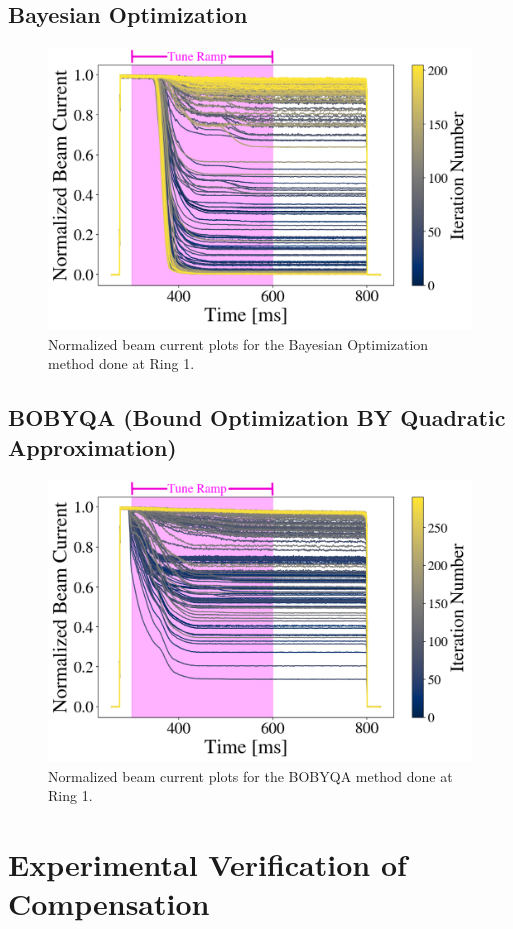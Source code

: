 \subsection{Bayesian Optimization}

\begin{figure}[H]
    \centering
    \includegraphics[width=\linewidth]{chapter5/i1_bo_commented.png}
    \caption{Normalized beam current plots for the Bayesian Optimization method done at Ring 1.}
    \label{fig:ibo}
\end{figure}

\subsection{BOBYQA (Bound Optimization BY Quadratic Approximation)}

\begin{figure}[H]
    \centering
    \includegraphics[width=\linewidth]{chapter5/i2_bobyqa_commented.png}
    \caption{Normalized beam current plots for the BOBYQA method done at Ring 1.}
    \label{fig:ibobyqa}
\end{figure}

\section{Experimental Verification of Compensation}
